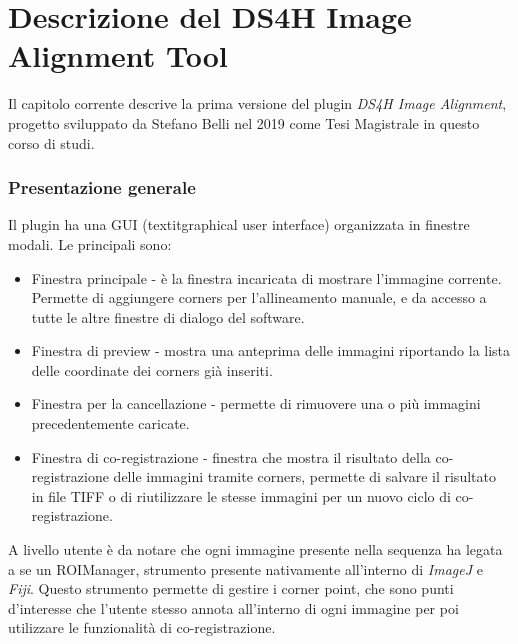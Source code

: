 \chapter{Descrizione del DS4H Image Alignment Tool}
\label{chap:descriptionoldtool}
\noindent Il capitolo corrente descrive la prima versione del plugin \textit{DS4H Image Alignment}, progetto sviluppato da Stefano Belli nel 2019 come Tesi Magistrale in questo corso di studi.

\subsection{Presentazione generale}
\noindent Il plugin ha una GUI (textit{graphical user interface}) organizzata in finestre modali. Le principali sono:
\begin{itemize}
	\item Finestra principale - è la finestra incaricata di mostrare l’immagine corrente. Permette di aggiungere corners per l’allineamento manuale, e da accesso a tutte le altre finestre di dialogo del software.
	\item Finestra di preview - mostra una anteprima delle immagini riportando la lista delle coordinate dei corners già inseriti.
	\item Finestra per la cancellazione - permette di rimuovere una o più immagini precedentemente caricate.
	\item Finestra di co-registrazione - finestra che mostra il risultato della co-registrazione delle immagini tramite corners, permette di salvare il risultato in file TIFF o di riutilizzare le stesse immagini per un nuovo ciclo di co-registrazione.
\end{itemize}

\noindent A livello utente è da notare che ogni immagine presente nella sequenza ha legata a se un ROIManager, strumento presente nativamente all'interno di \textit{ImageJ} e \textit{Fiji}. Questo strumento permette di gestire i corner point, che sono punti d'interesse che l'utente stesso annota all'interno di ogni immagine per poi utilizzare le funzionalità di co-registrazione.


